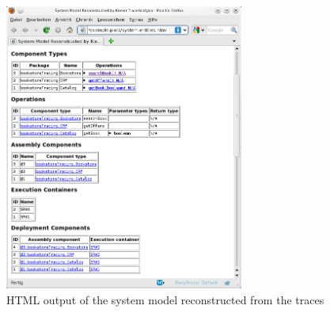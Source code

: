 \begin{figure}[h]\centering
\includegraphics[width=0.7\textwidth]{images/example-plots/system-entities-html-FFscrsh.png}
\caption{HTML output of the system model reconstructed from the traces}
\label{fig:appendix:traceAnalysisExample:htmlSystemModel}
\end{figure}
